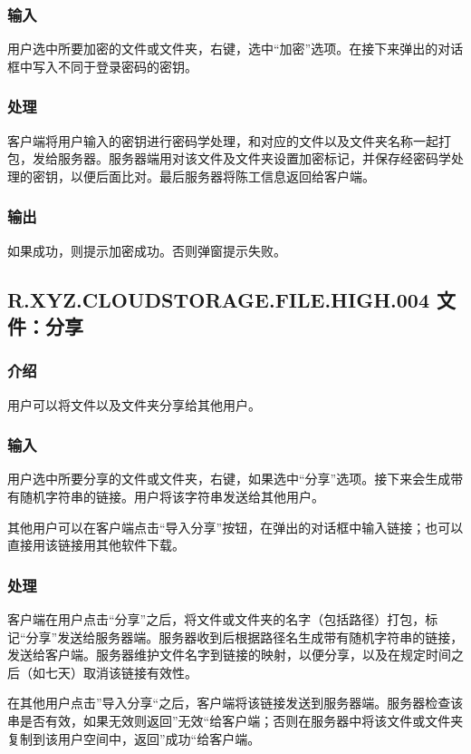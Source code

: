 \subsubsection{输入} 
用户选中所要加密的文件或文件夹，右键，选中“加密”选项。在接下来弹出的对话框中写入不同于登录密码的密钥。

\subsubsection{处理} 
客户端将用户输入的密钥进行密码学处理，和对应的文件以及文件夹名称一起打包，发给服务器。服务器端用对该文件及文件夹设置加密标记，并保存经密码学处理的密钥，以便后面比对。最后服务器将陈工信息返回给客户端。

\subsubsection{输出} 
如果成功，则提示加密成功。否则弹窗提示失败。


\subsection{R.XYZ.CLOUDSTORAGE.FILE.HIGH.004 文件：分享}

\subsubsection{介绍}
用户可以将文件以及文件夹分享给其他用户。

\subsubsection{输入} 
用户选中所要分享的文件或文件夹，右键，如果选中“分享”选项。接下来会生成带有随机字符串的链接。用户将该字符串发送给其他用户。

其他用户可以在客户端点击“导入分享”按钮，在弹出的对话框中输入链接；也可以直接用该链接用其他软件下载。

\subsubsection{处理} 
客户端在用户点击“分享”之后，将文件或文件夹的名字（包括路径）打包，标记“分享”发送给服务器端。服务器收到后根据路径名生成带有随机字符串的链接，发送给客户端。服务器维护文件名字到链接的映射，以便分享，以及在规定时间之后（如七天）取消该链接有效性。

在其他用户点击”导入分享“之后，客户端将该链接发送到服务器端。服务器检查该串是否有效，如果无效则返回”无效“给客户端；否则在服务器中将该文件或文件夹复制到该用户空间中，返回”成功“给客户端。

